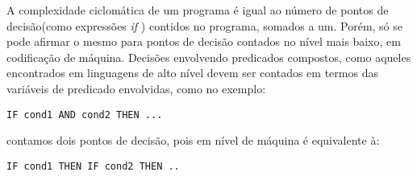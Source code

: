 A complexidade ciclomática de um programa é igual ao número de pontos de decisão(como expressões \textit{if} ) contidos no programa, somados a um. Porém, só se pode afirmar o mesmo para pontos de decisão contados no nível mais baixo, em codificação de máquina. Decisões envolvendo predicados compostos, como aqueles encontrados em linguagens de alto nível devem ser contados em termos das variáveis de predicado envolvidas, como no exemplo:
\begin{verbatim}
IF cond1 AND cond2 THEN ...
\end{verbatim}
contamos dois pontos de decisão, pois em nível de máquina é equivalente à:
\begin{verbatim}
IF cond1 THEN IF cond2 THEN ..
\end{verbatim}
%
%
%
